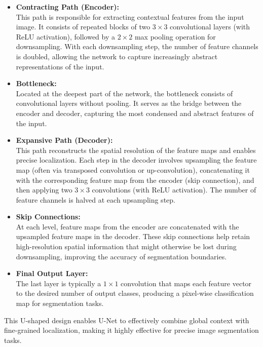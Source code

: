 \begin{itemize}
  \item \textbf{Contracting Path (Encoder):} \\
        This path is responsible for extracting contextual features from the input image. It consists of repeated blocks of two $3\times3$ convolutional layers (with ReLU activation), followed by a $2\times2$ max pooling operation for downsampling. With each downsampling step, the number of feature channels is doubled, allowing the network to capture increasingly abstract representations of the input.

  \item \textbf{Bottleneck:} \\
        Located at the deepest part of the network, the bottleneck consists of convolutional layers without pooling. It serves as the bridge between the encoder and decoder, capturing the most condensed and abstract features of the input.

  \item \textbf{Expansive Path (Decoder):} \\
        This path reconstructs the spatial resolution of the feature maps and enables precise localization. Each step in the decoder involves upsampling the feature map (often via transposed convolution or up-convolution), concatenating it with the corresponding feature map from the encoder (skip connection), and then applying two $3\times3$ convolutions (with ReLU activation). The number of feature channels is halved at each upsampling step.

  \item \textbf{Skip Connections:} \\
        At each level, feature maps from the encoder are concatenated with the upsampled feature maps in the decoder. These skip connections help retain high-resolution spatial information that might otherwise be lost during downsampling, improving the accuracy of segmentation boundaries.

  \item \textbf{Final Output Layer:} \\
        The last layer is typically a $1\times1$ convolution that maps each feature vector to the desired number of output classes, producing a pixel-wise classification map for segmentation tasks.
\end{itemize}

This U-shaped design enables U-Net to effectively combine global context with fine-grained localization, making it highly effective for precise image segmentation tasks.



